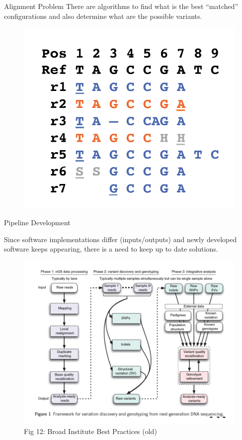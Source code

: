 \documentclass[11pt, aspectratio=43]{beamer}
\begin{document}
	
	\begin{frame}{Alignment Problem}
		There are algorithms to find what is the best “matched” configurations and
		also determine what are the possible variants.
		
		\begin{figure}[h]
			\centering
			\includegraphics[scale=0.45]{Figures/alignment_problem.png}
		\end{figure}	
		
	\end{frame}
	
	
	\begin{frame}{Pipeline Development}
		
		Since software implementations differ (inputs/outputs)  and newly developed software keeps appearing, there is a need to keep up to date solutions.
		
		\begin{figure}[h]
			\centering
			\includegraphics[scale=0.45]{Figures/pipeline.png}
			\caption{Fig 12: Broad Institute Best Practices (old)}
		\end{figure}
		
	\end{frame}
	
\end{document}
